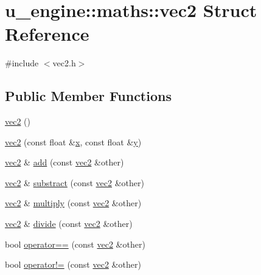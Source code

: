 \hypertarget{structu__engine_1_1maths_1_1vec2}{}\section{u\+\_\+engine\+:\+:maths\+:\+:vec2 Struct Reference}
\label{structu__engine_1_1maths_1_1vec2}


{\ttfamily \#include $<$vec2.\+h$>$}

\subsection*{Public Member Functions}
\begin{DoxyCompactItemize}
\item 
\hyperlink{structu__engine_1_1maths_1_1vec2_a1c09ec7cee1835bec73914006ca47630}{vec2} ()
\item 
\hyperlink{structu__engine_1_1maths_1_1vec2_a5e62f1ed2bc05f7a15d184aefbaad0f3}{vec2} (const float \&\hyperlink{glew_8h_ad77deca22f617d3f0e0eb786445689fc}{x}, const float \&\hyperlink{glew_8h_a9298c7ad619074f5285b32c6b72bfdea}{y})
\item 
\hyperlink{structu__engine_1_1maths_1_1vec2}{vec2} \& \hyperlink{structu__engine_1_1maths_1_1vec2_a77dcc6ea319d01b879b70a166e5e3b36}{add} (const \hyperlink{structu__engine_1_1maths_1_1vec2}{vec2} \&other)
\item 
\hyperlink{structu__engine_1_1maths_1_1vec2}{vec2} \& \hyperlink{structu__engine_1_1maths_1_1vec2_aa7e68398e0f2145437e596f49e3e2558}{substract} (const \hyperlink{structu__engine_1_1maths_1_1vec2}{vec2} \&other)
\item 
\hyperlink{structu__engine_1_1maths_1_1vec2}{vec2} \& \hyperlink{structu__engine_1_1maths_1_1vec2_a72e4eb0147653cfb7e11d17a95905a63}{multiply} (const \hyperlink{structu__engine_1_1maths_1_1vec2}{vec2} \&other)
\item 
\hyperlink{structu__engine_1_1maths_1_1vec2}{vec2} \& \hyperlink{structu__engine_1_1maths_1_1vec2_abd1b83d58c0be35cddb1240b97042ecd}{divide} (const \hyperlink{structu__engine_1_1maths_1_1vec2}{vec2} \&other)
\item 
bool \hyperlink{structu__engine_1_1maths_1_1vec2_a064d00472db4ca1dda5f088e5d38760d}{operator==} (const \hyperlink{structu__engine_1_1maths_1_1vec2}{vec2} \&other)
\item 
bool \hyperlink{structu__engine_1_1maths_1_1vec2_ae71445038d7dc1eb8a77f18b54a7bec2}{operator!=} (const \hyperlink{structu__engine_1_1maths_1_1vec2}{vec2} \&other)

\end{DoxyCompactItemize}
